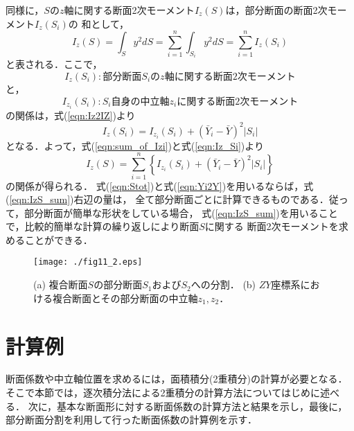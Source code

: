 \documentclass[10pt,a4j]{jbook}
\begin{document}
同様に，$S$の$z$軸に関する断面2次モーメント$I_z(S)$は，部分断面の断面2次モーメント$I_z(S_i)$の
和として，
\begin{equation}
	I_z(S)=\int_S y^2 dS=\sum_{i=1}^n\int_{S_i} y^2dS=\sum_{i=1}^n I_z(S_i)
	\label{eqn:sum_of_Izi}
\end{equation}
と表される．ここで，
\[
	I_z(S_i): 部分断面S_iのz軸に関する断面2次モーメント
\]
と，
\[
	I_{z_i}(S_i): S_i自身の中立軸z_iに関する断面2次モーメント
\]
の関係は，式(\ref{eqn:Iz2IZ})より
\begin{equation}
	I_z(S_i)=I_{z_i}(S_i)+\left( \bar Y_i-\bar{Y} \right)^2 \left|S_i\right|
	\label{eqn:Iz_Si}
\end{equation}
となる．よって，式(\ref{eqn:sum_of_Izi})と式(\ref{eqn:Iz_Si})より
\begin{equation}
	I_z(S)=
	\sum_{i=1}^n\left\{
		I_{z_i}(S_i)+\left( \bar Y_i-\bar{Y} \right)^2 \left|S_i\right|
	\right\}
	\label{eqn:IzS_sum}
\end{equation}
の関係が得られる．
式(\ref{eqn:Stot})と式(\ref{eqn:Yi2Y})を用いるならば，式(\ref{eqn:IzS_sum})右辺の量は，
全て部分断面ごとに計算できるものである．従って，部分断面が簡単な形状をしている場合，
式(\ref{eqn:IzS_sum})を用いることで，比較的簡単な計算の繰り返しにより断面$S$に関する
断面2次モーメントを求めることができる．
\begin{figure}[h]
	\begin{center}
	\texttt{[image: ./fig11\_2.eps]} 
	\end{center}
	\caption{
		(a) 複合断面$S$の部分断面$S_1$および$S_2$への分割．
		(b) $ZY$座標系における複合断面とその部分断面の中立軸$z_1,z_2$．
	} 
	\label{fig:fig11_2}
\end{figure}
\section{計算例}
断面係数や中立軸位置を求めるには，面積積分(2重積分)の計算が必要となる．
そこで本節では，逐次積分法による2重積分の計算方法についてはじめに述べる．
次に，基本な断面形に対する断面係数の計算方法と結果を示し，最後に，
部分断面分割を利用して行った断面係数の計算例を示す．
\end{document}
